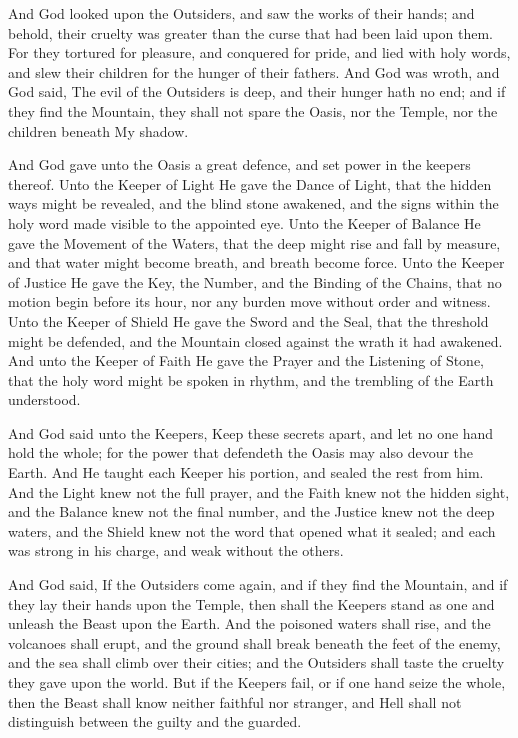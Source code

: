 \begin{scripture}
And God looked upon the Outsiders, and saw the works of their hands; and behold, their cruelty was greater than the curse that had been laid upon them.
For they tortured for pleasure, and conquered for pride, and lied with holy words, and slew their children for the hunger of their fathers.
And God was wroth, and God said, The evil of the Outsiders is deep, and their hunger hath no end; and if they find the Mountain, they shall not spare the Oasis, nor the Temple, nor the children beneath My shadow.
\end{scripture}

\begin{scripture}
And God gave unto the Oasis a great defence, and set power in the keepers thereof.
Unto the Keeper of Light He gave the Dance of Light, that the hidden ways might be revealed, and the blind stone awakened, and the signs within the holy word made visible to the appointed eye.
Unto the Keeper of Balance He gave the Movement of the Waters, that the deep might rise and fall by measure, and that water might become breath, and breath become force.
Unto the Keeper of Justice He gave the Key, the Number, and the Binding of the Chains, that no motion begin before its hour, nor any burden move without order and witness.
Unto the Keeper of Shield He gave the Sword and the Seal, that the threshold might be defended, and the Mountain closed against the wrath it had awakened.
And unto the Keeper of Faith He gave the Prayer and the Listening of Stone, that the holy word might be spoken in rhythm, and the trembling of the Earth understood.
\end{scripture}

\begin{scripture}
And God said unto the Keepers, Keep these secrets apart, and let no one hand hold the whole; for the power that defendeth the Oasis may also devour the Earth.
And He taught each Keeper his portion, and sealed the rest from him.
And the Light knew not the full prayer, and the Faith knew not the hidden sight, and the Balance knew not the final number, and the Justice knew not the deep waters, and the Shield knew not the word that opened what it sealed; and each was strong in his charge, and weak without the others.
\end{scripture}

\begin{scripture}
And God said, If the Outsiders come again, and if they find the Mountain, and if they lay their hands upon the Temple, then shall the Keepers stand as one and unleash the Beast upon the Earth.
And the poisoned waters shall rise, and the volcanoes shall erupt, and the ground shall break beneath the feet of the enemy, and the sea shall climb over their cities; and the Outsiders shall taste the cruelty they gave upon the world.
But if the Keepers fail, or if one hand seize the whole, then the Beast shall know neither faithful nor stranger, and Hell shall not distinguish between the guilty and the guarded.
\end{scripture}

